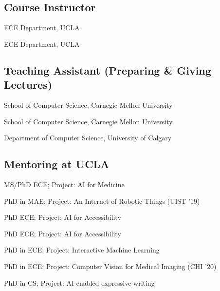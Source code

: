 \subsection{Course Instructor}

 {
	 {
		ECE Department, UCLA
	}
}

 {
	 {
		ECE Department, UCLA
	}
}

\subsection{Teaching Assistant (Preparing \& Giving Lectures)}

 {
	 {
		School of Computer Science, Carnegie Mellon University
	}
}

 {
	 {
		School of Computer Science, Carnegie Mellon University
	}
}

 {
	 {
		Department of Computer Science, University of Calgary
	}
}

\subsection{Mentoring at UCLA}
 {
	 {
		MS/PhD ECE; Project: AI for Medicine
	}
}

 {
	 {
		PhD in MAE; Project: An Internet of Robotic Things (UIST '19)
	}
}

 {
	 {
		PhD ECE; Project: AI for Accessibility	}
}

 {
	 {
		PhD ECE; Project: AI for Accessibility	}
}

 {
	 {
		PhD in ECE; Project: Interactive Machine Learning
	}
}

 {
	 {
		PhD in ECE; Project: Computer Vision for Medical Imaging (CHI '20)	
	}
}

 {
	 {
		PhD in CS; Project: AI-enabled expressive writing	
	}
}


